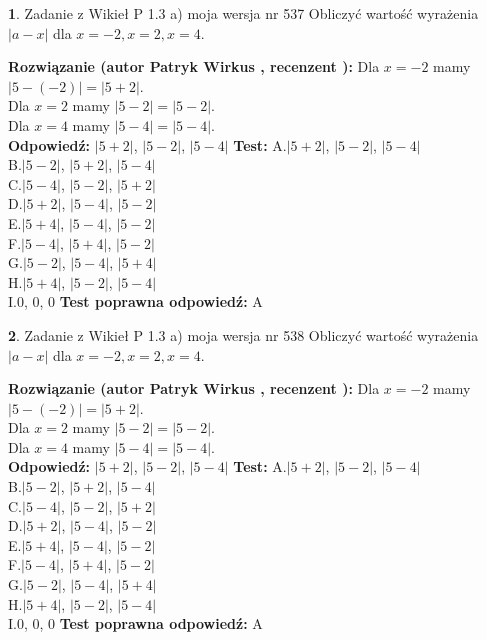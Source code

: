 \documentclass[12pt, a4paper]{article}
\theoremstyle{definition} %
\newtheorem{zad}{}
\newcommand{\zadStart}[1]{\begin{zad}#1\newline}
\newcommand{\zadStop}{\end{zad}}
\newcommand{\rozwStart}[2]{\noindent \textbf{Rozwiązanie (autor #1 , recenzent #2): }\newline}
\newcommand{\rozwStop}{\newline}
\newcommand{\odpStart}{\noindent \textbf{Odpowiedź:}\newline}
\newcommand{\odpStop}{\newline}
\newcommand{\testStart}{\noindent \textbf{Test:}\newline}
\newcommand{\testStop}{\newline}
\newcommand{\kluczStart}{\noindent \textbf{Test poprawna odpowiedź:}\newline}
\newcommand{\kluczStop}{\newline}
\begin{document}
\zadStart{Zadanie z Wikieł P 1.3 a) moja wersja nr 537}
Obliczyć wartość wyrażenia $|a - x|$ dla $x=-2,x=2,x=4$.
\zadStop
\rozwStart{Patryk Wirkus}{}
Dla $x = -2$ mamy $|5 - (-2)| = |5 + 2|$.\\
Dla $x = 2$ mamy $|5 - 2| = |5 - 2|$.\\
Dla $x = 4$ mamy $|5 - 4| = |5 - 4|$.\\
\rozwStop
\odpStart
$|5 + 2|$, $|5 - 2|$, $|5 - 4|$
\odpStop
\testStart
A.$|5 + 2|$, $|5 - 2|$, $|5 - 4|$\\
B.$|5 - 2|$, $|5 + 2|$, $|5 - 4|$\\
C.$|5 - 4|$, $|5 - 2|$, $|5 + 2|$\\
D.$|5 + 2|$, $|5 - 4|$, $|5 - 2|$\\
E.$|5 + 4|$, $|5 - 4|$, $|5 - 2|$\\
F.$|5 - 4|$, $|5 + 4|$, $|5 - 2|$\\
G.$|5 - 2|$, $|5 - 4|$, $|5 + 4|$\\
H.$|5 + 4|$, $|5 - 2|$, $|5 - 4|$\\
I.$0$, $0$, $0$
\testStop
\kluczStart
A
\kluczStop



\zadStart{Zadanie z Wikieł P 1.3 a) moja wersja nr 538}
Obliczyć wartość wyrażenia $|a - x|$ dla $x=-2,x=2,x=4$.
\zadStop
\rozwStart{Patryk Wirkus}{}
Dla $x = -2$ mamy $|5 - (-2)| = |5 + 2|$.\\
Dla $x = 2$ mamy $|5 - 2| = |5 - 2|$.\\
Dla $x = 4$ mamy $|5 - 4| = |5 - 4|$.\\
\rozwStop
\odpStart
$|5 + 2|$, $|5 - 2|$, $|5 - 4|$
\odpStop
\testStart
A.$|5 + 2|$, $|5 - 2|$, $|5 - 4|$\\
B.$|5 - 2|$, $|5 + 2|$, $|5 - 4|$\\
C.$|5 - 4|$, $|5 - 2|$, $|5 + 2|$\\
D.$|5 + 2|$, $|5 - 4|$, $|5 - 2|$\\
E.$|5 + 4|$, $|5 - 4|$, $|5 - 2|$\\
F.$|5 - 4|$, $|5 + 4|$, $|5 - 2|$\\
G.$|5 - 2|$, $|5 - 4|$, $|5 + 4|$\\
H.$|5 + 4|$, $|5 - 2|$, $|5 - 4|$\\
I.$0$, $0$, $0$
\testStop
\kluczStart
A
\kluczStop
\end{document}
